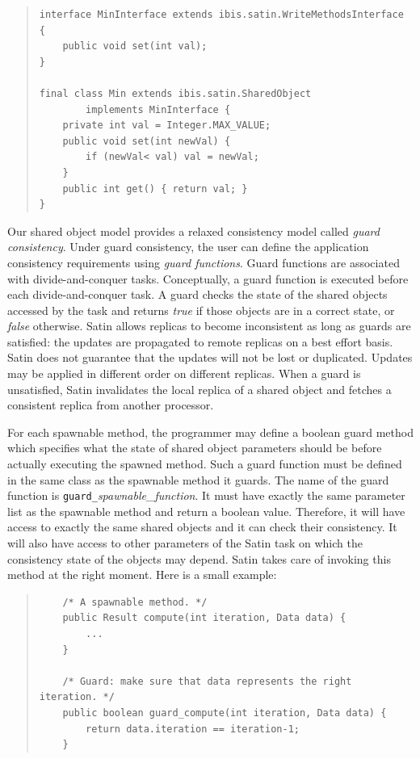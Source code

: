 \documentclass[10pt]{article}
\begin{document}
{\small
\begin{quote}
\begin{verbatim}
interface MinInterface extends ibis.satin.WriteMethodsInterface {
    public void set(int val);
}

final class Min extends ibis.satin.SharedObject
        implements MinInterface {
    private int val = Integer.MAX_VALUE;
    public void set(int newVal) {
        if (newVal< val) val = newVal;
    }
    public int get() { return val; }
}

\end{verbatim}
\end{quote}
}

Our shared object model provides a relaxed consistency model called
\textit{guard consistency}.
Under guard consistency, the user can define the application consistency
requirements using \textit{guard functions}. Guard functions are
associated with divide-and-conquer tasks. Conceptually, a guard
function is executed before each divide-and-conquer task.
A guard checks the state of the shared objects accessed by the task and
returns \textit{true} if those objects are in a correct state,
or \textit{false} otherwise.
Satin allows replicas to become inconsistent as long as
guards are satisfied: the updates are propagated to remote replicas on a
best effort basis.
Satin does not guarantee that the updates will not be lost or duplicated.
Updates may be applied in different order on different replicas.
When a guard is unsatisfied, Satin invalidates the local replica of a shared
object and fetches a consistent replica from another processor.

For each spawnable method, the programmer may define a boolean guard
method which specifies what the state of shared object parameters should
be before actually executing the spawned method.
Such a guard function must be defined in the same class as the spawnable
method it guards.
The name of the guard function is
\texttt{guard\_}\textit{spawnable\_function}.
It must have exactly the same parameter list as the spawnable method
and return a boolean value.
Therefore, it will have access to exactly the same shared
objects and it can check their consistency.
It will also have access to other parameters of the Satin task on which the
consistency state of the objects may depend. 
Satin takes care of invoking this method at the right moment.
Here is a small example:

{\small
\begin{quote}
\begin{verbatim}
    /* A spawnable method. */
    public Result compute(int iteration, Data data) {
        ...
    }

    /* Guard: make sure that data represents the right iteration. */
    public boolean guard_compute(int iteration, Data data) {
        return data.iteration == iteration-1;
    }
\end{verbatim}
\end{quote}
}
\end{document}
